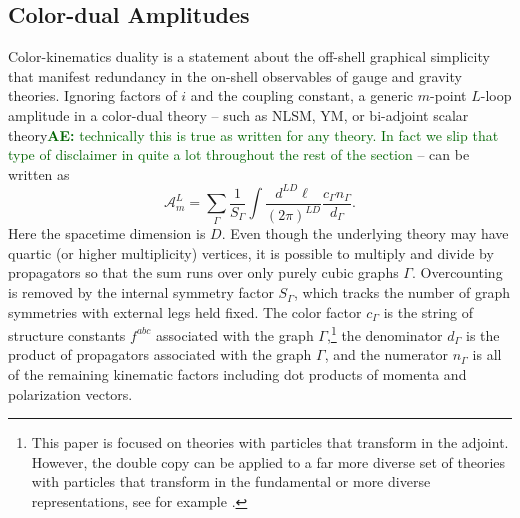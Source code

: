 \documentclass[11pt,letter]{article}
\newcommand{\ace}[1]{\textcolor{darkgreen}{\textbf{AE:}{ #1}}}
\begin{document}
\subsection{Color-dual Amplitudes}\label{onShellCK}


Color-kinematics duality is a statement about the off-shell graphical
simplicity that manifest redundancy in the on-shell observables of
gauge and gravity theories. Ignoring factors of $i$ and the coupling
constant, a generic $m$-point $L$-loop amplitude in a color-dual
theory -- such as NLSM, YM, or bi-adjoint scalar
theory\ace{technically this is true as written for any theory.  In
  fact we slip that type of disclaimer in quite a lot throughout the
  rest of the section} -- can be written as
\begin{equation}
\mathcal{A}_m^L = \sum \limits_\Gamma \frac{1}{S_\Gamma} \int \frac{d^{LD}\ell}{(2\pi)^{LD}} \frac{c_\Gamma n_\Gamma}{d_\Gamma} .
\end{equation}
Here the spacetime dimension is $D$.  Even though the underlying
theory may have quartic (or higher multiplicity) vertices, it is
possible to multiply and divide by propagators so that the sum runs
over only purely cubic graphs $\Gamma$.  Overcounting is removed by
the internal symmetry factor $S_\Gamma$, which tracks the number of
graph symmetries with external legs held fixed.  The color factor
$c_\Gamma$ is the string of structure constants $f^{abc}$ associated
with the graph $\Gamma$,\footnote{This paper is focused on theories
  with particles that transform in the adjoint.  However, the double
  copy can be applied to a far more diverse set of theories with
  particles that transform in the fundamental or more diverse
  representations, see for example \cite{Johansson:2017srf,
    Johansson2014zca, Johansson:2015oia, Johansson:2019dnu,
    Carrasco:2023vjg, Carrasco:2020ywq}.}  the denominator $d_\Gamma$
is the product of propagators associated with the graph $\Gamma$, and
the numerator $n_\Gamma$ is all of the remaining kinematic factors
including dot products of momenta and polarization vectors.
\end{document}
